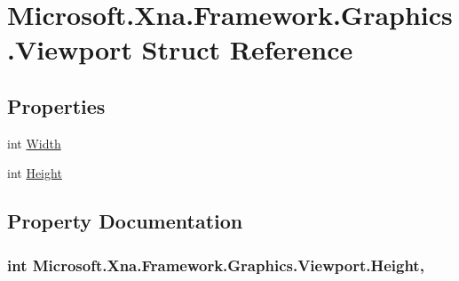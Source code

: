 \hypertarget{struct_microsoft_1_1_xna_1_1_framework_1_1_graphics_1_1_viewport}{}\section{Microsoft.\+Xna.\+Framework.\+Graphics.\+Viewport Struct Reference}
\label{struct_microsoft_1_1_xna_1_1_framework_1_1_graphics_1_1_viewport}
\subsection*{Properties}
\begin{DoxyCompactItemize}
\item 
int \hyperlink{struct_microsoft_1_1_xna_1_1_framework_1_1_graphics_1_1_viewport_ab132ca62f33dec7c17c06e6e1ef4528b}{Width}
\item 
int \hyperlink{struct_microsoft_1_1_xna_1_1_framework_1_1_graphics_1_1_viewport_a5985651589f51ad937ae0418cd839e1d}{Height}
\end{DoxyCompactItemize}


\subsection{Property Documentation}
\hypertarget{struct_microsoft_1_1_xna_1_1_framework_1_1_graphics_1_1_viewport_a5985651589f51ad937ae0418cd839e1d}{}
\subsubsection[{Height}]{\setlength{\rightskip}{0pt plus 5cm}int Microsoft.\+Xna.\+Framework.\+Graphics.\+Viewport.\+Height\hspace{0.3cm}{\ttfamily [get]}, {\ttfamily [set]}}\label{struct_microsoft_1_1_xna_1_1_framework_1_1_graphics_1_1_viewport_a5985651589f51ad937ae0418cd839e1d}
\hypertarget{struct_microsoft_1_1_xna_1_1_framework_1_1_graphics_1_1_viewport_ab132ca62f33dec7c17c06e6e1ef4528b}{}
